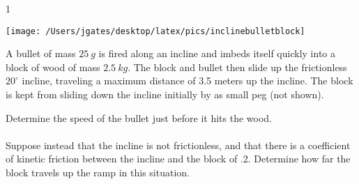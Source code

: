
\AddToShipoutPicture*{\BackgroundPic}

\addtocounter {ProbNum} {1}

\begin{floatingfigure}[r]{.42\textwidth}
\texttt{[image: /Users/jgates/desktop/latex/pics/inclinebulletblock]}
\end{floatingfigure}
 
{\bf \Large{}} A bullet of mass $25~g$ is fired along an incline and imbeds itself quickly into a block of wood of mass $2.5~kg$. The block and bullet then slide up the frictionless $20^{\circ}$ incline, traveling a maximum distance of 3.5 meters up the incline. The block is kept from sliding down the incline initially by as small peg (not shown).

\bigskip
Determine the speed of the bullet just before it hits the wood.\paragraph{}
\noindent
\vfill

Suppose instead that the incline is not frictionless, and that there is a coefficient of kinetic friction between the incline and the block of .2.  Determine how far the block travels up the ramp in this situation. 
\vfill
\newpage